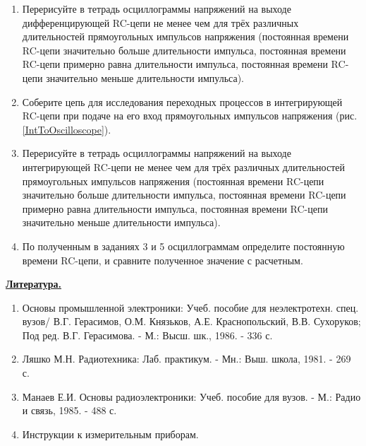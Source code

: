 \documentclass[14pt,a4paper]{article}
\begin{document}
\begin{enumerate}
\item Перерисуйте в тетрадь осциллограммы напряжений на выходе
  дифференцирующей RC-цепи не менее чем для трёх различных длительностей
  прямоугольных импульсов напряжения (постоянная времени RC-цепи
  значительно больше длительности импульса, постоянная времени RC-цепи
  примерно равна длительности импульса, постоянная времени RC-цепи
  значительно меньше длительности импульса).
\item
  Соберите цепь для исследования переходных процессов в интегрирующей
  RC-цепи при подаче на его вход прямоугольных импульсов напряжения
  (рис. \ref{IntToOscilloscope}).
\item
  Перерисуйте в тетрадь осциллограммы напряжений на выходе интегрирующей
  RC-цепи не менее чем для трёх различных длительностей прямоугольных
  импульсов напряжения (постоянная времени RC-цепи значительно больше
  длительности импульса, постоянная времени RC-цепи примерно равна
  длительности импульса, постоянная времени RC-цепи значительно меньше
  длительности импульса).
\item
  По полученным в заданиях 3 и 5 осциллограммам определите постоянную
  времени RC-цепи, и сравните полученное значение с расчетным.
\end{enumerate}

\textbf{\underline{Литература.}}

\begin{enumerate}
\def\labelenumi{\arabic{enumi}.}
\item Основы   промышленной электроники: Учеб. пособие для неэлектротехн. спец. вузов/ В.Г. Герасимов, О.М. Князьков, А.Е. Краснопольский, В.В. Сухоруков; Под ред. В.Г. Герасимова. - М.: Высш. шк., 1986. - 336 с.
\item Ляшко М.Н. Радиотехника: Лаб. практикум. - Мн.: Выш. школа, 1981. - 269 с.
\item Манаев Е.И. Основы радиоэлектроники: Учеб. пособие для вузов. - М.: Радио и связь, 1985. - 488 с.
\item Инструкции к измерительным приборам.
\end{enumerate}
\end{document}
